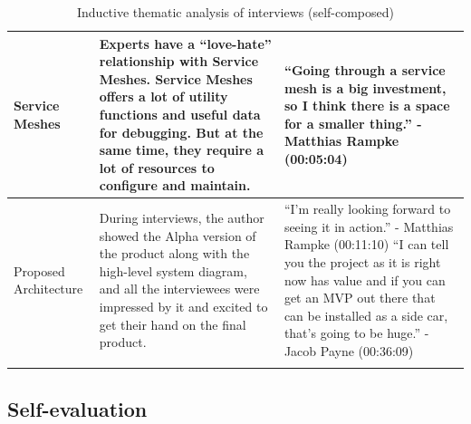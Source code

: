\begin{longtable}{|p{30mm}|p{61mm}|p{60mm}|}
    
    Service Meshes &
    Experts have a “love-hate” relationship with Service Meshes. Service Meshes offers a lot of utility functions and useful data for debugging. But at the same time, they require a lot of resources to configure and maintain. &
    “Going through a service mesh is a big investment, so I think there is a space for a smaller thing.” \newline- Matthias Rampke (00:05:04) \\ \hline
    
    Proposed Architecture &
    During interviews, the author showed the Alpha version of the product along with the high-level system diagram, and all the interviewees were impressed by it and excited to get their hand on the final product. &
    “I'm really looking forward to seeing it in action.”  \newline- Matthias Rampke (00:11:10)
    \newline
    \newline
    “I can tell you the project as it is right now has value and if you can get an MVP out there that can be installed as a side car, that's going to be huge.” \newline- Jacob Payne (00:36:09) \\ \hline

\caption{Inductive thematic analysis of interviews (self-composed)}
\end{longtable}

\subsection{Self-evaluation}



